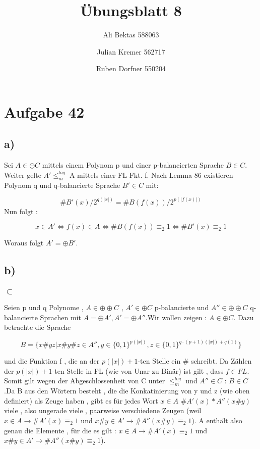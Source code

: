 \documentclass{article}
\title{Übungsblatt 8}
\author{Ali Bektas 588063 \and Julian Kremer 562717 \and Ruben Dorfner 550204}
\begin{document}
	\maketitle
	
	\section*{Aufgabe 42}

	\subsection*{a)}
		Sei $A\in \oplus C$ mittels einem Polynom p und einer p-balancierten Sprache $B \in C$. Weiter gelte $A' \leq^{log}_m$ A mittels einer FL-Fkt. f. Nach Lemma 86 existieren Polynom q und q-balancierte Sprache $B'\in C$ mit:

		\[
			\#B'(x)/2^{q(|x|)} = \#B(f(x))/2^{p(|f(x)|)}
		\]
		Nun folgt :

		\[
			x \in A' \iff f(x) \in A \iff \#B(f(x)) \equiv_2 1 \iff \#B'(x) \equiv_2 1
		\]

		Woraus folgt $A' = \oplus B'$.
	\subsection*{b)}
		\subsubsection*{$\subset$}
			Seien p und q Polynome , $A \in \oplus \oplus C$ , $A' \in \oplus C$ p-balancierte und $A'' \in \oplus \oplus C$ q-balancierte Sprachen mit 
			$A = \oplus A'  , A' = \oplus A''$.Wir wollen zeigen : $A \in \oplus C$. Dazu betrachte die  Sprache 
			
			\[
			B= \{ x\#yz| x\#y\#z \in A'' ,  y \in \{0,1\}^{p(|x|)} , z \in \{0,1\}^{q\cdot (p+1)(|x|) + q(1)} \}
			\] 

			und die Funktion f , die an der $p(|x|)+1$-ten Stelle ein \# schreibt. Da Zählen der $p(|x|)+1$-ten Stelle in FL (wie von Unar zu Binär) ist gilt , dass $f \in FL$. Somit gilt wegen der Abgeschlossenheit von C unter $\leq^{log}_m$ und $A'' \in C$ : $B \in C$.Da B aus den Wörtern besteht , die die Konkatinierung von y und z (wie oben definiert) als Zeuge haben , gibt es für jedes Wort $x \in A$  $\#A'(x) * A''(x\#y)$ viele , also ungerade viele , paarweise verschiedene Zeugen (weil $x \in A \rightarrow \#A'(x) \equiv_2 1 $ und $x\#y \in A' \rightarrow \#A''(x\#y)\equiv_2 1$). A enthält also genau die Elemente , für die es gilt : $x \in A \rightarrow \#A'(x) \equiv_2 1 $ und $x\#y \in A' \rightarrow \#A''(x\#y)\equiv_2 1$). 
\end{document}
